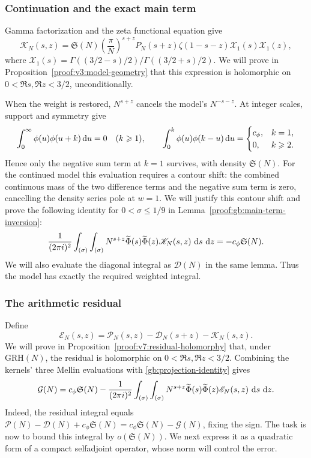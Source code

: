 \documentclass[12pt,a4paper]{amsart}
\numberwithin{equation}{section}
\def\d{\,{\rm d}}
\def\le{\leqslant}
\def\ge{\geqslant}
\theoremstyle{plain}
\theoremstyle{definition}
\theoremstyle{remark}
\begin{document}
\subsubsection{Continuation and the exact main term}

Gamma factorization and the zeta functional equation give
\begin{equation}\label{v3:model-functional-form}
 {\mathscr K}_N(s,z)=\mathfrak S(N)\left(\frac\pi N\right)^{s+z}
 P_N(s+z)\zeta(1-s-z)\mathcal X_1(s)\mathcal X_1(z),
\end{equation}
where $\mathcal X_1(s)=\Gamma((3/2-s)/2)/\Gamma((3/2+s)/2)$.
We will prove in Proposition~\ref{proof:v3:model-geometry} that this
expression is holomorphic on $0<\Re s,\Re z<3/2$, unconditionally.

When the weight is restored, $N^{s+z}$ cancels the model's
$N^{-s-z}$. At integer scales, support and symmetry give
\[
 \int_0^\infty\phi(u)\phi(u+k)\d u=0\quad(k\ge1),
 \qquad
 \int_0^k\phi(u)\phi(k-u)\d u=
 \begin{cases}
 c_\phi,&k=1,\\
 0,&k\ge2.
 \end{cases}
\]
Hence only the negative sum term at $k=1$ survives, with density
$\mathfrak S(N)$. For the continued model this evaluation requires
a contour shift: the combined continuous mass of the two difference
terms and the negative sum term is zero, cancelling the density
series pole at $w=1$. We will justify this contour shift and prove
the following identity for $0<\sigma\le1/9$ in
Lemma~\ref{proof:gb:main-term-inversion}:
\[
 \frac1{(2\pi i)^2}\int_{(\sigma)}\int_{(\sigma)}
 N^{s+z}\widetilde{\Phi}(s)\widetilde{\Phi}(z)
 {\mathscr K}_N(s,z)\,\d s\,\d z
 =-c_\phi\mathfrak S(N).
\]
We will also evaluate the diagonal integral as $\mathcal D(N)$ in the same lemma.
Thus the model has exactly the required weighted integral.

\subsubsection{The arithmetic residual}

Define
\[
 \mathscr E_N(s,z)
 =\mathscr P_N(s,z)-{\mathscr D}_N(s+z)-{\mathscr K}_N(s,z).
\]
We will prove in Proposition~\ref{proof:v7:residual-holomorphy} that,
under $\mathrm{GRH}(N)$, the residual is holomorphic on
$0<\Re s,\Re z<3/2$. Combining the kernels'
three Mellin evaluations with \eqref{gb:projection-identity} gives
\[
 \mathcal G(N)=c_\phi\mathfrak S(N)
 -\frac1{(2\pi i)^2}\int_{(\sigma)}\int_{(\sigma)}
 N^{s+z}\widetilde{\Phi}(s)\widetilde{\Phi}(z)
 \mathscr E_N(s,z)\,\d s\,\d z.
\]
Indeed, the residual integral equals
$\mathcal P(N)-\mathcal D(N)+c_\phi\mathfrak S(N)
=c_\phi\mathfrak S(N)-\mathcal G(N)$, fixing the sign.
The task is now to bound this integral by $o(\mathfrak S(N))$.
We next express it as a quadratic form of a compact selfadjoint
operator, whose norm will control the error.
\end{document}
